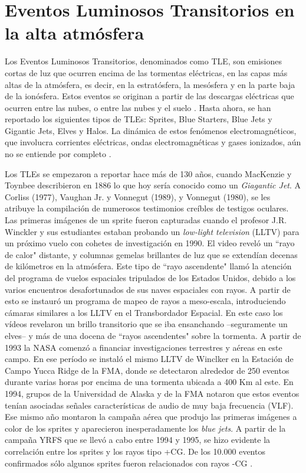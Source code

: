 \documentclass[12pt,oneside,openany,letter]{book}
\begin{document}
\chapter{Eventos Luminosos Transitorios en la alta atmósfera}\label{TLEs}
Los Eventos Luminosos Transitorios, denominados como TLE, son emisiones cortas de luz que ocurren encima de las tormentas eléctricas, en las capas más altas de la atmósfera, es decir, en la estratósfera, la mesósfera y en la parte baja de la ionósfera. Estos eventos se originan a partir de las descargas eléctricas que ocurren entre las nubes, o entre las nubes y el suelo \cite{DwyerUman2014}. Hasta ahora, se han reportado los siguientes tipos de TLEs: Sprites, Blue Starters, Blue Jets y Gigantic Jets, Elves y Halos. La dinámica de estos fenómenos electromagnéticos, que involucra corrientes eléctricas, ondas electromagnéticas y gases ionizados, aún no se entiende por completo \cite{Maiorana2014}.

Los TLEs se empezaron a reportar hace más de 130 años, cuando MacKenzie y Toynbee describieron en 1886 lo que hoy sería conocido como un \textit{Giagantic Jet}. A Corliss (1977), Vaughan Jr. y Vonnegut (1989), y Vonnegut
(1980), se les atribuye la compilación de numerosos testimonios creíbles de testigos oculares. Las primeras imágenes de un sprite fueron capturadas cuando el profesor J.R. Winckler y sus estudiantes estaban probando un \textit{low-light television} (LLTV) para un próximo vuelo con cohetes de investigación en 1990. El video reveló un ``rayo de calor" distante, y columnas gemelas brillantes de luz que se extendían decenas de kilómetros en la atmósfera. Este tipo de ``rayo ascendente" llamó la atención del programa de vuelos espaciales tripulados de los Estados Unidos, debido a los varios encuentros desafortunados de sus naves espaciales con rayos. A partir de esto se instauró un programa de mapeo de rayos a meso-escala, introduciendo cámaras similares a los LLTV en el Transbordador Espacial. En este caso los vídeos revelaron un brillo transitorio que se iba ensanchando --seguramente un elves-- y más de una docena de ``rayos ascendentes" sobre la tormenta. A partir de 1993 la NASA comenzó a financiar investigaciones terrestres y aéreas en este campo. En ese período se instaló el mismo LLTV de Winclker en la Estación de Campo Yucca Ridge de la FMA, donde se detectaron alrededor de 250 eventos durante varias horas por encima de una tormenta ubicada a 400 Km al este. En 1994, grupos de la Universidad de Alaska y de la FMA notaron que estos eventos tenían asociadas señales características de audio de muy baja frecuencia (VLF). Ese mismo año montaron la campaña aérea que produjo las primeras imágenes a color de los sprites y aparecieron inesperadamente los \textit{blue jets}. A partir de la campaña YRFS que se llevó a cabo entre 1994 y 1995, se hizo evidente la correlación entre los sprites y los rayos tipo +CG. De los 10.000 eventos confirmados sólo algunos sprites fueron relacionados con rayos -CG \cite{FullekrugEtal2006}. 
\end{document}
